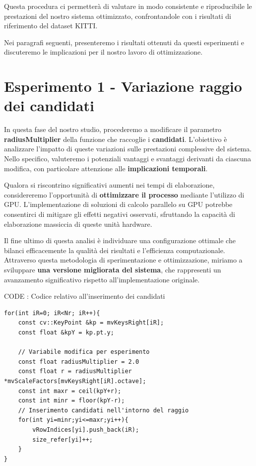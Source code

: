 \documentclass[12pt,a4paper]{report}
\begin{document}
Questa procedura ci permetterà di valutare in modo consistente e riproducibile le prestazioni del nostro sistema ottimizzato, confrontandole con i risultati di riferimento del dataset KITTI.

Nei paragrafi seguenti, presenteremo i risultati ottenuti da questi esperimenti e discuteremo le implicazioni per il nostro lavoro di ottimizzazione.

\newpage
\section{Esperimento 1 - Variazione raggio dei candidati}

In questa fase del nostro studio, procederemo a modificare il parametro \textbf{radiusMultiplier}  della funzione che raccoglie i \textbf{candidati}. L'obiettivo è analizzare l'impatto di queste variazioni sulle prestazioni complessive del sistema. Nello specifico, valuteremo i potenziali vantaggi e svantaggi derivanti da ciascuna modifica, con particolare attenzione alle \textbf{implicazioni temporali}.

Qualora si riscontrino significativi aumenti nei tempi di elaborazione, considereremo l'opportunità di \textbf{ottimizzare il processo} mediante l'utilizzo di GPU. L'implementazione di soluzioni di calcolo parallelo su GPU potrebbe consentirci di mitigare gli effetti negativi osservati, sfruttando la capacità di elaborazione massiccia di queste unità hardware.

Il fine ultimo di questa analisi è individuare una configurazione ottimale che bilanci efficacemente la qualità dei risultati e l'efficienza computazionale. Attraverso questa metodologia di sperimentazione e ottimizzazione, miriamo a sviluppare \textbf{una versione migliorata del sistema}, che rappresenti un avanzamento significativo rispetto all'implementazione originale.

\vspace{1cm}

CODE : Codice relativo all'inserimento dei candidati
\begin{lstlisting}
for(int iR=0; iR<Nr; iR++){
    const cv::KeyPoint &kp = mvKeysRight[iR];
    const float &kpY = kp.pt.y;
    
    // Variabile modifica per esperimento
    const float radiusMultiplier = 2.0 
    const float r = radiusMultiplier *mvScaleFactors[mvKeysRight[iR].octave];  
    const int maxr = ceil(kpY+r);
    const int minr = floor(kpY-r);
    // Inserimento candidati nell'intorno del raggio
    for(int yi=minr;yi<=maxr;yi++){
        vRowIndices[yi].push_back(iR);
        size_refer[yi]++;   
    }
}
\end{lstlisting}
\end{document}
